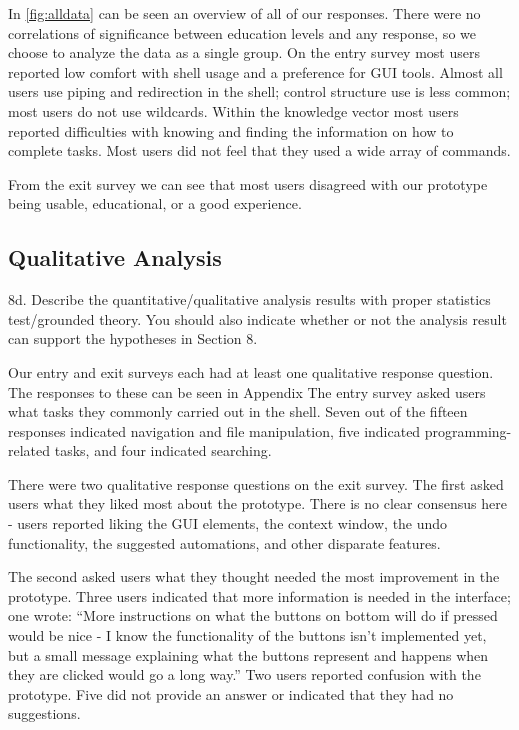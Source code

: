In \ref{fig:alldata} can be seen an overview of all of our responses. There were no
correlations of significance between education levels and any response, so we
choose to analyze the data as a single group. On the entry survey most users
reported low comfort with shell usage and a preference for GUI tools. Almost all
users use piping and redirection in the shell; control structure use is less
common; most users do not use wildcards. Within the knowledge vector most users
reported difficulties with knowing and finding the information on how to
complete tasks. Most users did not feel that they used a wide array of commands.

From the exit survey we can see that most users disagreed with our prototype
being usable, educational, or a good experience.

\subsection{Qualitative Analysis}
    8d. Describe the quantitative/qualitative analysis results with proper
    statistics test/grounded theory. You should also indicate whether or not the
    analysis result can support the hypotheses in Section 8.

Our entry and exit surveys each had at least one qualitative response question.
The responses to these can be seen in Appendix
The entry survey asked users what tasks they commonly carried out in the shell.
Seven out of the fifteen responses indicated navigation and file manipulation,
five indicated programming-related tasks, and four indicated searching.

There were two qualitative response questions on the exit survey. The first
asked users what they liked most about the prototype. There is no clear
consensus here \-- users reported liking the GUI elements, the context window, the
undo functionality, the suggested automations, and other disparate features.

The second asked users what they thought needed the most improvement in the
prototype. Three users indicated that more information is needed in the
interface; one wrote: ``More instructions on what the buttons on bottom will do
if pressed would be nice \-- I know the functionality of the buttons isn't
implemented yet, but a small message explaining what the buttons represent and
happens when they are clicked would go a long way.'' Two users reported
confusion with the prototype. Five did not provide an answer or indicated that
they had no suggestions.

